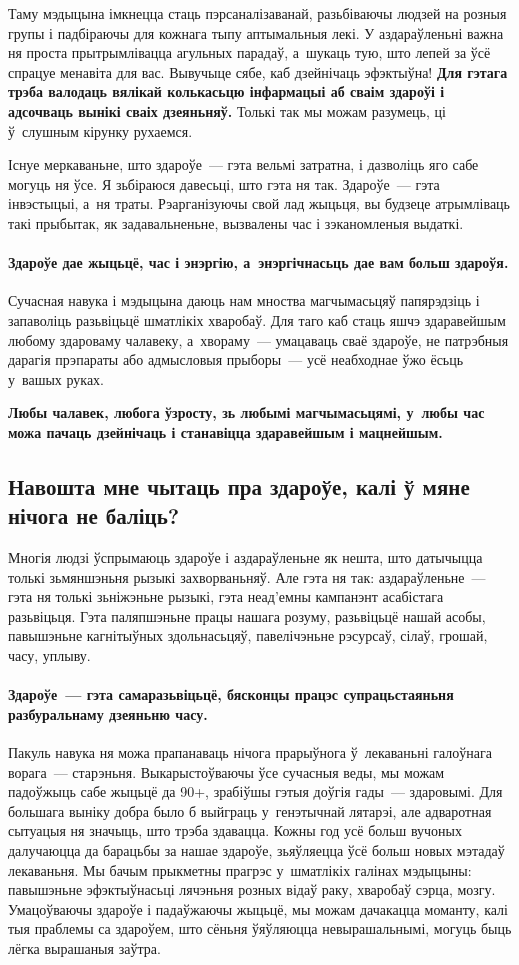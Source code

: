 Таму мэдыцына імкнецца стаць пэрсаналізаванай, разьбіваючы людзей на розныя групы і падбіраючы для кожнага тыпу аптымальныя лекі. У аздараўленьні важна ня проста прытрымлівацца агульных парадаў, а~шукаць тую, што лепей за ўсё спрацуе менавіта для вас. Вывучыце сябе, каб дзейнічаць эфэктыўна! \textbf{Для гэтага трэба валодаць вялікай колькасьцю інфармацыі аб сваім здароўі і адсочваць вынікі сваіх дзеяньняў.} Толькі так мы можам разумець, ці ў~слушным кірунку рухаемся.

Існуе меркаваньне, што здароўе~--- гэта вельмі затратна, і дазволіць яго сабе могуць ня ўсе. Я зьбіраюся давесьці, што гэта ня так. Здароўе~--- гэта інвэстыцыі, а~ня траты. Рэарганізуючы свой лад жыцьця, вы будзеце атрымліваць такі прыбытак, як задавальненьне, вызвалены час і зэканомленыя выдаткі.

\paragraph{Здароўе дае жыцьцё, час і энэргію, а~энэргічнасьць дае вам больш здароўя.} Сучасная навука і мэдыцына даюць нам мноства магчымасьцяў папярэдзіць і запаволіць разьвіцьцё шматлікіх хваробаў. Для таго каб стаць яшчэ здаравейшым любому здароваму чалавеку, а~хвораму~--- умацаваць сваё здароўе, не патрэбныя дарагія прэпараты або адмысловыя прыборы~--- усё неабходнае ўжо ёсьць у~вашых руках. 

\textbf{Любы чалавек, любога ўзросту, зь любымі магчымасьцямі, у~любы час можа пачаць дзейнічаць і станавіцца здаравейшым і мацнейшым.}

\subsection*{Навошта мне чытаць пра здароўе, калі ў мяне нічога не баліць?}

Многія людзі ўспрымаюць здароўе і аздараўленьне як нешта, што датычыцца толькі зьмяншэньня рызыкі захворваньняў. Але гэта ня так: аздараўленьне~--- гэта ня толькі зьніжэньне рызыкі, гэта неад'емны кампанэнт асабістага разьвіцьця. Гэта паляпшэньне працы нашага розуму, разьвіцьцё нашай асобы, павышэньне кагнітыўных здольнасьцяў, павелічэньне рэсурсаў, сілаў, грошай, часу, уплыву.

\paragraph{Здароўе~--- гэта самаразьвіцьцё, бясконцы працэс супрацьстаяньня разбуральнаму дзеяньню часу.} Пакуль навука ня можа прапанаваць нічога прарыўнога ў~лекаваньні галоўнага ворага~--- старэньня. Выкарыстоўваючы ўсе сучасныя веды, мы можам падоўжыць сабе жыцьцё да 90+, зрабіўшы гэтыя доўгія гады~--- здаровымі. Для большага выніку добра было б выйграць у~генэтычнай лятарэі, але адваротная сытуацыя ня значыць, што трэба здавацца. Кожны год усё больш вучоных далучаюцца да барацьбы за нашае здароўе, зьяўляецца ўсё больш новых мэтадаў лекаваньня. Мы бачым прыкметны прагрэс у~шматлікіх галінах мэдыцыны: павышэньне эфэктыўнасьці лячэньня розных відаў раку, хваробаў сэрца, мозгу. Умацоўваючы здароўе і падаўжаючы жыцьцё, мы можам дачакацца моманту, калі тыя праблемы са здароўем, што сёньня ўяўляюцца невырашальнымі, могуць быць лёгка вырашаныя заўтра.

